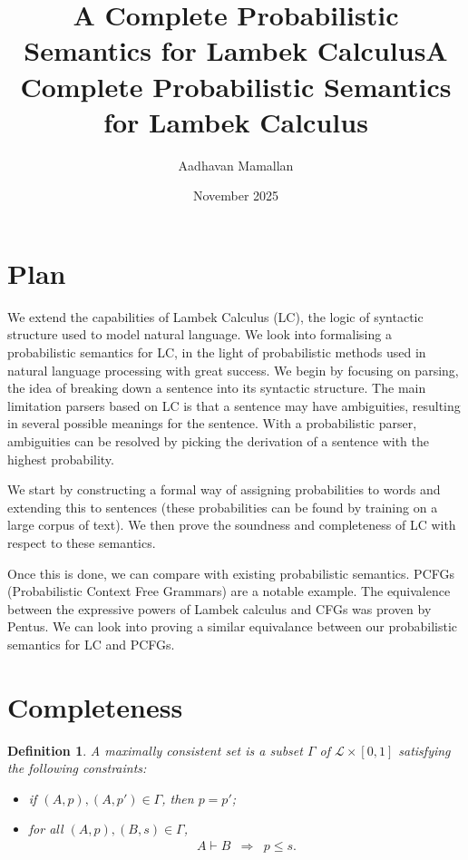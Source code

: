 \documentclass[11pt]{article}
\title{A Complete Probabilistic Semantics for Lambek Calculus}
\author{}
\date{}
\title{A Complete Probabilistic Semantics for Lambek Calculus}
\author{Aadhavan Mamallan}
\date{November 2025}
\newtheorem{definition}{Definition}
\begin{document}
\maketitle

\section{Plan}

We extend the capabilities of Lambek Calculus (LC), the logic of syntactic structure used to model natural language. We look into formalising a probabilistic semantics for LC, in the light of probabilistic methods used in natural language processing with great success. We begin by focusing on parsing, the idea of breaking down a sentence into its syntactic structure. The main limitation parsers based on LC is that a sentence may have ambiguities, resulting in several possible meanings for the sentence. With a probabilistic parser, ambiguities can be resolved by picking the derivation of a sentence with the highest probability.

We start by constructing a formal way of assigning probabilities to words and extending this to sentences (these probabilities can be found by training on a large corpus of text). We then prove the soundness and completeness of LC with respect to these semantics. 

Once this is done, we can compare with existing probabilistic semantics. PCFGs (Probabilistic Context Free Grammars) are a notable example. The equivalence between the expressive powers of Lambek calculus and CFGs was proven by Pentus. We can look into proving a similar equivalance between our probabilistic semantics for LC and PCFGs. 

\section{Completeness}

\begin{definition}
A maximally consistent set is a subset $\Gamma$ of $\mathcal{L} \times [0, 1]$ satisfying the following constraints:
\begin{itemize}
    \item if $(A, p), (A, p') \in \Gamma$, then $p = p'$;
    \item for all $(A, p), (B, s) \in \Gamma$,
    $$
    \begin{array}{lcl}
         A \vdash B & \Longrightarrow & p \leqslant s. \\
    \end{array}
    $$
\end{itemize}
\end{definition}
\end{document}
